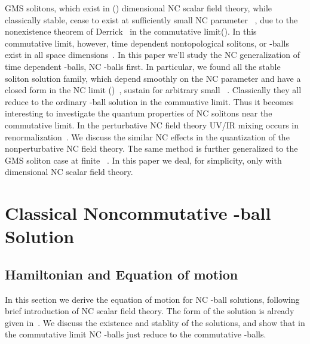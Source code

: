 \documentclass[a4paper,a4paper]{article}
\begin{document}
GMS solitons, which exist in (\coordHE{})
dimensional NC scalar field theory, while classically stable, 
cease to exist at sufficiently small NC parameter \myHighlight{$\theta$}\coordHE{}\ , due to the
nonexistence theorem of Derrick~\cite{Derrick} in the commutative
limit(\coordHE{}).  In this commutative limit, however,
time dependent nontopological solitons, or \coordHE{}-balls exist in all
space dimensions~\cite{LeeReport,Coleman}. 
In this paper we'll study the NC generalization of time dependent
\coordHE{}-balls, NC \coordHE{}-balls first. In particular, we found all the stable 
soliton solution
family, which depend smoothly on the NC parameter \myHighlight{$\theta$}\coordHE{} and have a
closed form in the NC limit (\myHighlight{$\theta\rightarrow\infty$}\coordHE{})~\cite{Dur},
sustain for arbitrary small \myHighlight{$\theta$}\coordHE{}\ . Classically they
all reduce to the ordinary \coordHE{}-ball solution in the commuative
limit. Thus it becomes interesting to investigate the  
quantum properties of NC solitons near the commutative limit. In the
perturbative NC field theory UV/IR mixing occurs in renormalization~\cite{MRS}. 
We discuss the similar NC effects in the quantization of the
nonperturbative NC field theory.  The same method is further generalized 
to the GMS soliton case at finite \myHighlight{$\theta$}\coordHE{}\ . In this paper we deal, for
simplicity, only with \coordHE{} dimensional NC scalar field theory.

\section{Classical Noncommutative \coordHE{}-ball Solution}

\subsection{Hamiltonian and Equation of motion}

In this section we derive the equation of motion for NC \coordHE{}-ball
solutions, following brief introduction of NC scalar field
theory. The form of the solution is already given in~\cite{NCQball}. 
We discuss the existence and stablity of the solutions,
and show that in the commutative limit NC \coordHE{}-balls just reduce to the
commutative \coordHE{}-balls. 
\end{document}
